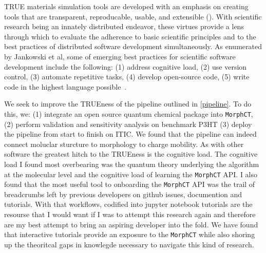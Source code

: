 
TRUE materials simulation tools are developed with an emphasis on creating tools that are
transparent, reproducable, usable, and extensible (\cite{Cummings2017}).
With scientific research being an innately distributed endeavor, these virtues provide a lens through which to
evaluate the adherence to basic scientific principles and to the best practices of distributed software development
simultaneously. As enumerated by Jankowski et al, some of emerging best practices for scientific software
development include the following: (1) address cognitive load, (2) use version control, (3) automate
repetitive tasks, (4) develop open-source code, (5) write code in the highest language possible~\cite{Jankowski2020}.

We seek to improve the TRUEness of the pipeline outlined in \autoref{pipeline}.
To do this, we: (1) integrate an open source quantum chemical package into \texttt{MorphCT},
(2) perform validation and sensitivity analysis on benchmark P3HT
(3) deploy the pipeline from start to finish on ITIC. 
We found that the pipeline can indeed connect moluclar sturcture to morphology to charge
mobility. As with other software the greatest hitch to the TRUEness is the
cognitive load. The cognitive load I found most overbearing was the quantum theory underlying the algorithm 
at the molecular level and the cognitive load of learning the \texttt{MorphCT} API. 
I also found that the most useful tool to onboarding the \texttt{MorphCT} API was the
trail of breadcrumbs left by previous developers on github issues, documention and tutorials. 
With that workflows, codified into jupyter notebook tutorials are the resourse that I would want if I was to
attempt this research again and therefore are my best attempt to bring an aspiring developer into the fold.
We have found that interactive tutorials provide an exposure to the \texttt{MorphCT} while also shoring up the
theoritcal gaps in knowlegde necessary to navigate this kind of research. 

